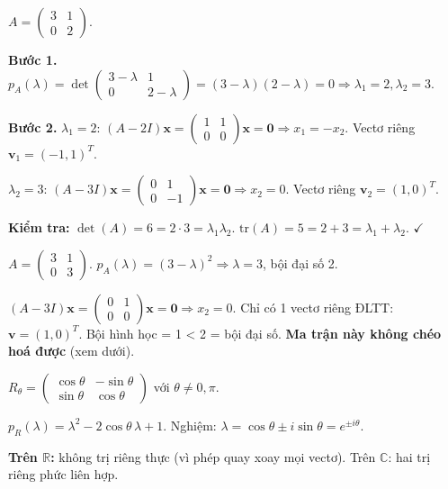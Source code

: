 \documentclass[12pt,a4paper]{article}
\begin{document}
\begin{vidu}[title={Tìm trị riêng và vectơ riêng cấp 2}]
$A = \begin{pmatrix}3 & 1\\ 0 & 2\end{pmatrix}$.

\textbf{Bước 1.} $p_A(\lambda) = \det\begin{pmatrix}3-\lambda & 1\\ 0 & 2-\lambda\end{pmatrix} = (3-\lambda)(2-\lambda) = 0 \Rightarrow \lambda_1 = 2, \lambda_2 = 3$.

\textbf{Bước 2.} $\lambda_1 = 2$: $(A - 2I)\mathbf{x} = \begin{pmatrix}1 & 1\\ 0 & 0\end{pmatrix}\mathbf{x} = \mathbf{0} \Rightarrow x_1 = -x_2$. Vectơ riêng $\mathbf{v}_1 = (-1, 1)^T$.

$\lambda_2 = 3$: $(A - 3I)\mathbf{x} = \begin{pmatrix}0 & 1\\ 0 & -1\end{pmatrix}\mathbf{x} = \mathbf{0} \Rightarrow x_2 = 0$. Vectơ riêng $\mathbf{v}_2 = (1, 0)^T$.

\textbf{Kiểm tra:} $\det(A) = 6 = 2\cdot 3 = \lambda_1\lambda_2$. $\mathrm{tr}(A) = 5 = 2+3 = \lambda_1+\lambda_2$. $\checkmark$
\end{vidu}

\begin{vidu}[title={Trường hợp bội đại số > bội hình học}]
$A = \begin{pmatrix}3 & 1\\ 0 & 3\end{pmatrix}$. $p_A(\lambda) = (3-\lambda)^2 \Rightarrow \lambda = 3$, bội đại số 2.

$(A - 3I)\mathbf{x} = \begin{pmatrix}0 & 1\\ 0 & 0\end{pmatrix}\mathbf{x} = \mathbf{0} \Rightarrow x_2 = 0$. Chỉ có 1 vectơ riêng ĐLTT: $\mathbf{v} = (1, 0)^T$. Bội hình học = 1 < 2 = bội đại số. \textbf{Ma trận này không chéo hoá được} (xem dưới).
\end{vidu}

\begin{vidu}[title={Ma trận phép quay -- trị riêng không thực}]
$R_\theta = \begin{pmatrix}\cos\theta & -\sin\theta\\ \sin\theta & \cos\theta\end{pmatrix}$ với $\theta \ne 0, \pi$.

$p_R(\lambda) = \lambda^2 - 2\cos\theta\, \lambda + 1$. Nghiệm: $\lambda = \cos\theta \pm i\sin\theta = e^{\pm i\theta}$.

\textbf{Trên $\mathbb{R}$:} không trị riêng thực (vì phép quay xoay mọi vectơ). Trên $\mathbb{C}$: hai trị riêng phức liên hợp.
\end{vidu}
\end{document}
